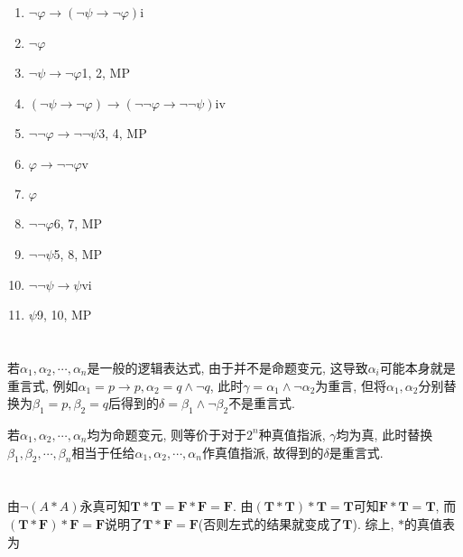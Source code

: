 \documentclass[UTF-8]{ctexart}
\begin{document}
\subsection{}
\begin{enumerate}
	\item $\lnot\varphi \to (\lnot\psi \to \lnot\varphi)$\hfill i
	\item $\lnot\varphi$
	\item $\lnot\psi \to \lnot\varphi$\hfill 1, 2, MP
	\item $(\lnot\psi \to \lnot\varphi) \to (\lnot\lnot\varphi \to \lnot\lnot\psi)$\hfill iv
	\item $\lnot\lnot\varphi \to \lnot\lnot\psi$\hfill 3, 4, MP
	\item $\varphi \to \lnot\lnot\varphi$\hfill v
	\item $\varphi$
	\item $\lnot\lnot\varphi$\hfill 6, 7, MP
	\item $\lnot\lnot\psi$\hfill 5, 8, MP
	\item $\lnot\lnot\psi \to \psi$\hfill vi
	\item $\psi$\hfill 9, 10, MP
	
\end{enumerate}

\section{}
若$\alpha_1, \alpha_2, \cdots, \alpha_n$是一般的逻辑表达式, 由于并不是命题变元, 这导致$\alpha_i$可能本身就是重言式, 例如$\alpha_1 = p \to p, \alpha_2 = q \wedge \lnot q$, 此时$\gamma = \alpha_1 \wedge \lnot \alpha_2$为重言, 但将$\alpha_1, \alpha_2$分别替换为$\beta_1 = p, \beta_2 = q$后得到的$\delta = \beta_1 \wedge \lnot \beta_2$不是重言式.

若$\alpha_1, \alpha_2, \cdots, \alpha_n$均为命题变元, 则等价于对于$2^n$种真值指派, $\gamma$均为真, 此时替换$\beta_1, \beta_2, \cdots, \beta_n$相当于任给$\alpha_1, \alpha_2, \cdots, \alpha_n$作真值指派, 故得到的$\delta$是重言式.

\section{}
由$\lnot (A * A)$永真可知$\mathbf T * \mathbf T = \mathbf F * \mathbf F = \mathbf F$. 由$(\mathbf T * \mathbf T) * \mathbf T = \mathbf T$可知$\mathbf F * \mathbf T = \mathbf T$, 而$(\mathbf T * \mathbf F) * \mathbf F = \mathbf F$说明了$\mathbf T * \mathbf F = \mathbf F$(否则左式的结果就变成了$\mathbf T$). 综上, $*$的真值表为
\end{document}
